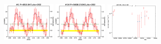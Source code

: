 \documentclass{aastex63}
\begin{document}
\begin{figure}[!ht]
\centering
\includegraphics[angle =0, width = 0.24\textwidth]{./figure/LW/pfold_lc_324001_cut.eps}
\hfill
\includegraphics[angle =0, width = 0.24\textwidth]{./figure/LW/pfold_lc_324002_cut.eps}
\hfill
\includegraphics[angle =0, width = 0.24\textwidth]{./figure/LW/324001_lc_cut.eps}
\hfill
{}
\end{figure}
\end{document}
